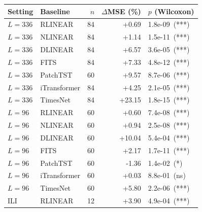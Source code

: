 \begin{tabular}{llrrl}
\toprule
Setting & Baseline & $n$ & $\Delta$MSE (\%) & $p$ (Wilcoxon) \\
\midrule
$L{=}336$ & RLINEAR & 84 & +0.69 & 1.8e-09~(***) \\
$L{=}336$ & NLINEAR & 84 & +1.14 & 1.5e-11~(***) \\
$L{=}336$ & DLINEAR & 84 & +6.57 & 3.6e-05~(***) \\
$L{=}336$ & FITS & 84 & +7.33 & 4.8e-12~(***) \\
$L{=}336$ & PatchTST & 60 & +9.57 & 8.7e-06~(***) \\
$L{=}336$ & iTransformer & 84 & +4.25 & 2.1e-05~(***) \\
$L{=}336$ & TimesNet & 84 & +23.15 & 1.8e-15~(***) \\
$L{=}96$ & RLINEAR & 60 & +0.60 & 7.4e-08~(***) \\
$L{=}96$ & NLINEAR & 60 & +0.94 & 2.5e-08~(***) \\
$L{=}96$ & DLINEAR & 60 & +10.04 & 5.4e-04~(***) \\
$L{=}96$ & FITS & 60 & +2.17 & 1.7e-11~(***) \\
$L{=}96$ & PatchTST & 60 & -1.36 & 1.4e-02~(*) \\
$L{=}96$ & iTransformer & 60 & +0.03 & 8.8e-01~(ns) \\
$L{=}96$ & TimesNet & 60 & +5.80 & 2.2e-06~(***) \\
ILI & RLINEAR & 12 & +3.90 & 4.9e-04~(***) \\
\bottomrule
\end{tabular}